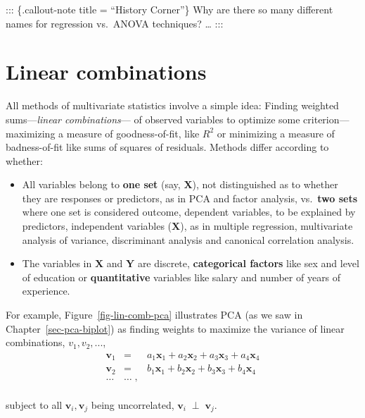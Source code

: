\documentclass[
  letterpaper,
  10pt,
  krantz2]{krantz}
\begin{document}
::: \{.callout-note title = ``History Corner''\} Why are there so many
different names for regression vs.~ANOVA techniques? \ldots{} :::

\hypertarget{linear-combinations}{%
\section{Linear combinations}\label{linear-combinations}}

All methods of multivariate statistics involve a simple idea: Finding
weighted sums---\emph{linear combinations}--- of observed variables to
optimize some criterion---maximizing a measure of goodness-of-fit, like
\(R^2\) or minimizing a measure of badness-of-fit like sums of squares
of residuals. Methods differ according to whether:

\begin{itemize}
\item
  All variables belong to \textbf{one set} (say, \(\mathbf{X}\)), not
  distinguished as to whether they are responses or predictors, as in
  PCA and factor analysis, vs.~\textbf{two sets} where one set is
  considered outcome, dependent variables, to be explained by
  predictors, independent variables (\(\mathbf{X}\)), as in multiple
  regression, multivariate analysis of variance, discriminant analysis
  and canonical correlation analysis.
\item
  The variables in \(\mathbf{X}\) and \(\mathbf{Y}\) are discrete,
  \textbf{categorical factors} like sex and level of education or
  \textbf{quantitative} variables like salary and number of years of
  experience.
\end{itemize}

For example, Figure~\ref{fig-lin-comb-pca} illustrates PCA (as we saw in
Chapter~\ref{sec-pca-biplot}) as finding weights to maximize the
variance of linear combinations, \(v_1, v_2, ...\), \begin{eqnarray*}
\mathbf{v}_1 & = & a_1 \mathbf{x}_1 + a_2 \mathbf{x}_2 + a_3 \mathbf{x}_3 + a_4 \mathbf{x}_4 \\
\mathbf{v}_2 & = & b_1 \mathbf{x}_1 + b_2 \mathbf{x}_2 + b_3 \mathbf{x}_3 + b_4 \mathbf{x}_4 \\
\dots & \dots \; , \\
\end{eqnarray*}

subject to all \(\mathbf{v}_i, \mathbf{v}_j\) being uncorrelated,
\(\mathbf{v}_i \;\perp\; \mathbf{v}_j\).
\end{document}
